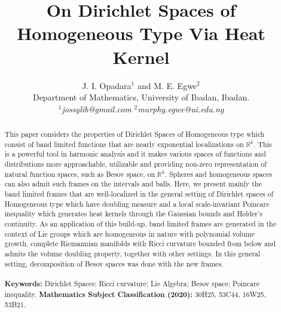 \documentclass[10pt]{article}
\theoremstyle{definition}
\numberwithin{equation}{section}
\begin{document}
	 \baselineskip 10pt
	\newcommand{\disp}{\displaystyle}
	\renewcommand*\contentsname{Table of Contents}
	\thispagestyle{empty}
	\newcommand{\HRule}{\rule{\linewidth}{0.1mm}}
	\linespread{1.0}
	 \baselineskip 10pt
	\thispagestyle{empty}
	\title{\textbf{On Dirichlet Spaces of Homogeneous Type Via Heat Kernel}}
	\author{J. I. Opadara$^1$ and M. E. Egwe$^2$ \\ Department of Mathematics, University of Ibadan, Ibadan.\\ $^1$\emph{jossylib@gmail.com}\; $^2$\emph{murphy.egwe@ui.edu.ng}}
	\maketitle
	\large	
	\begin{abstract}
This paper considers the properties of Dirichlet Spaces of Homogeneous type which consist of band limited functions that are nearly
exponential localizations on $\mathbb{R}^k.$ This is a powerful tool in harmonic analysis and it makes various spaces of functions and distributions more approachable, utilizable and providing non-zero representation of natural function spaces, such as Besov space,
on $\mathbb{R}^k$. Spheres and homogeneous spaces can also admit such frames on the intervals and balls. Here, we present mainly the band limited frames that are well-localized in the general setting of Dirichlet spaces of Homogeneous type which have doubling measure and a local scale-invariant Poincare inequality which generates heat kernels through the Gaussian bounds and H$\ddot{o}$lder's continuity. As an application of this build-up, band limited frames are generated in the context of Lie groups which are homogeneous in nature with polynomial volume growth, complete Riemannian manifolds with Ricci curvature bounded from below and admits the volume doubling property, together with other settings. In this general setting, decomposition of Besov spaces was done with the new frames.
\ \\
\ \\
\textbf{Keywords:} Dirichlet Spaces; Ricci curvature; Lie Algebra; Besov space; Poincare inequality.
\textbf{Mathematics Subject Classification (2020):} 30H25, 53C44, 16W25, 53B21.
	\end{abstract}
	
\end{document}
